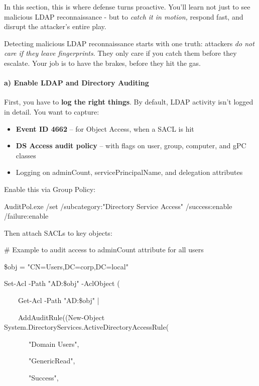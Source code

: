 {{In this section, this is where defense turns proactive. You’ll learn not just to see malicious LDAP reconnaissance - but to \textit{catch it in motion, }respond fast, and disrupt the attacker’s entire play.

Detecting malicious LDAP reconnaissance starts with one truth: attackers \textit{do not care if they leave fingerprints}. They only care if you catch them before they escalate. Your job is to have the brakes, before they hit the gas.

\paragraph{\textbf{   a) Enable LDAP and Directory Auditing}}

First, you have to \textbf{log the right things}. By default, LDAP activity isn’t logged in detail. You want to capture:

\begin{itemize}
    \item \textbf{Event ID 4662} – for Object Access, when a SACL is hit

    \item \textbf{DS Access audit policy} – with flags on user, group, computer, and gPC classes

    \item Logging on adminCount, servicePrincipalName, and delegation attributes

\end{itemize}
Enable this via Group Policy:

 

 

AuditPol.exe /set /subcategory:"Directory Service Access" /success:enable /failure:enable

Then attach SACLs to key objects:

 

 

\# Example to audit access to adminCount attribute for all users

\$obj = "CN=Users,DC=corp,DC=local"

Set-Acl -Path "AD:\$obj" -AclObject (

    Get-Acl -Path "AD:\$obj" | 

    AddAuditRule((New-Object System.DirectoryServices.ActiveDirectoryAccessRule(

       "Domain Users",

       "GenericRead",

       "Success",

}}
